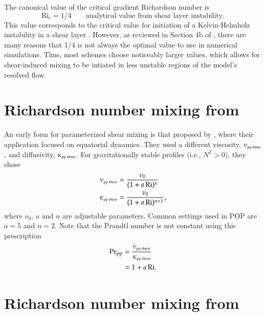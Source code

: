 The canonical value of the critical gradient Richardson number is
\begin{equation}
 \mbox{Ri}_{c} =1/4   \qquad \mbox{analytical value from shear layer instability.} 
\end{equation}
This value corresponds to the critical value for initiation of a
Kelvin-Helmholz instability in a shear layer \citep{miles1961}.
However, as reviewed in Section 4b of \cite{Jacksonetal2008}, there
are many reasons that 1/4 is not always the optimal value to use in
numerical simulations.  Thus, most schemes choose noticeably larger
values, which allows for shear-induced mixing to be intiated in less
unstable regions of the model's resolved flow.




\section{Richardson number mixing from \cite{PPvmix}}
\label{section:shear-instability-parameterized-ppvmix}

An early form for parameterized shear mixing is that proposed by
\cite{PPvmix}, where their application focused on equatorial dynamics.
They used a different viscosity, $\nu_{\mbox{\tiny pp shear}}$, and
diffusivity, $\kappa_{\mbox{\tiny pp shear}}$.  For gravitationally
stable profiles (i.e., $N^{2} > 0$), they chose
\begin{align}
 \nu_{\mbox{\tiny pp shear}}&= \frac{\nu_{0}}{(1 + a  \, \mbox{Ri})^{n}} 
\\
 \kappa_{\mbox{\tiny pp shear}}&= \frac{\nu_{0}}{(1 + a  \, \mbox{Ri})^{n+1}}, 
\end{align}
where $\nu_{0}$, $a$ and $n$ are adjustable parameters.  Common
settings used in POP are $a=5$ and $n=2$.  Note that the Prandtl
number is not constant using this prescription
\begin{subequations}
\begin{align}
  \mbox{Pr}_{\mbox{\scriptsize pp}} &= \frac{\nu_{\mbox{\tiny pp shear}}}{\kappa_{\mbox{\tiny pp  shear}}} 
 \\
 &= 1 + a  \, \mbox{Ri}.
\end{align}
\end{subequations}


\section{Richardson number mixing from \cite{LargeKPP}}
\label{section:shear-instability-parameterized-kpp}

